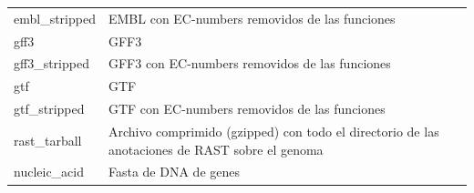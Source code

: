 \documentclass[12pt,twoside]{reedthesis}
\begin{document}
{\begin{longtable}[]{@{}ll@{}}
\begin{minipage}[t]{0.22\columnwidth}
  embl\_stripped\strut
  \end{minipage} & \begin{minipage}[t]{0.72\columnwidth}\raggedright\strut
  EMBL con EC-numbers removidos de las funciones\strut
  \end{minipage}\tabularnewline
  \begin{minipage}[t]{0.22\columnwidth}\raggedright\strut
  gff3\strut
  \end{minipage} & \begin{minipage}[t]{0.72\columnwidth}\raggedright\strut
  GFF3\strut
  \end{minipage}\tabularnewline
  \begin{minipage}[t]{0.22\columnwidth}\raggedright\strut
  gff3\_stripped\strut
  \end{minipage} & \begin{minipage}[t]{0.72\columnwidth}\raggedright\strut
  GFF3 con EC-numbers removidos de las funciones\strut
  \end{minipage}\tabularnewline
  \begin{minipage}[t]{0.22\columnwidth}\raggedright\strut
  gtf\strut
  \end{minipage} & \begin{minipage}[t]{0.72\columnwidth}\raggedright\strut
  GTF\strut
  \end{minipage}\tabularnewline
  \begin{minipage}[t]{0.22\columnwidth}\raggedright\strut
  gtf\_stripped\strut
  \end{minipage} & \begin{minipage}[t]{0.72\columnwidth}\raggedright\strut
  GTF con EC-numbers removidos de las funciones\strut
  \end{minipage}\tabularnewline
  \begin{minipage}[t]{0.22\columnwidth}\raggedright\strut
  rast\_tarball\strut
  \end{minipage} & \begin{minipage}[t]{0.72\columnwidth}\raggedright\strut
  Archivo comprimido (gzipped) con todo el directorio de las anotaciones
  de RAST sobre el genoma\strut
  \end{minipage}\tabularnewline
  \begin{minipage}[t]{0.22\columnwidth}\raggedright\strut
  nucleic\_acid\strut
  \end{minipage} & \begin{minipage}[t]{0.72\columnwidth}\raggedright\strut
  Fasta de DNA de genes\strut
  \end{minipage}\tabularnewline

\end{longtable}}
\end{document}
